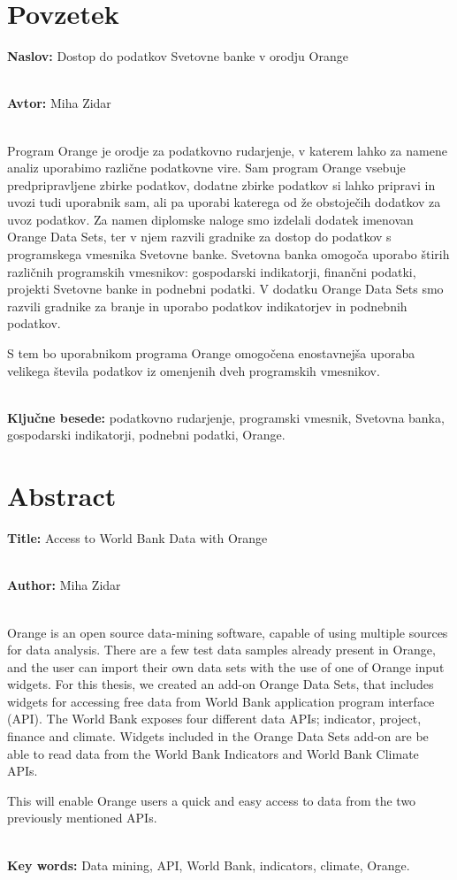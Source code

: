 \chapter*{Povzetek}


\textbf{Naslov:} Dostop do podatkov Svetovne banke v orodju Orange

\ \\
\textbf{Avtor:} Miha Zidar

\ \\
Program Orange je orodje za podatkovno rudarjenje, v katerem
lahko za namene analiz uporabimo različne podatkovne vire. Sam program Orange
vsebuje predpripravljene zbirke podatkov, dodatne zbirke podatkov si lahko 
pripravi in uvozi tudi uporabnik sam, ali pa uporabi katerega od že obstoječih
dodatkov za uvoz podatkov. Za namen diplomske naloge smo izdelali dodatek imenovan
Orange Data Sets, ter v njem razvili gradnike za dostop do podatkov s programskega 
vmesnika Svetovne banke. Svetovna banka omogoča uporabo štirih 
različnih programskih vmesnikov: gospodarski indikatorji, finančni podatki,
projekti Svetovne banke in podnebni podatki. V dodatku Orange Data Sets smo
razvili gradnike za branje in uporabo podatkov indikatorjev 
in podnebnih podatkov.

S tem bo uporabnikom programa Orange omogočena enostavnejša uporaba velikega števila
podatkov iz omenjenih dveh programskih vmesnikov.

\ \\
\textbf{Ključne besede:} podatkovno rudarjenje, programski vmesnik, 
Svetovna banka, gospodarski indikatorji, podnebni podatki, Orange. 




\clearemptydoublepage

\chapter*{Abstract}


\textbf{Title:} Access to World Bank Data with Orange

\ \\
\textbf{Author:} Miha Zidar

\ \\
Orange is an open source data-mining software, capable of using multiple sources for data analysis. There are a few test data samples already present in Orange, and the user can import their own data sets with the use of one of Orange input widgets. For this thesis, we created an add-on Orange Data Sets, that includes widgets for accessing free data from World Bank application program interface (API). The World Bank exposes four different data APIs; indicator, project, finance and climate. Widgets included in the Orange Data Sets add-on are be able to read data from the World Bank Indicators and World Bank Climate APIs.

This will enable Orange users a quick and easy access to data from the two previously mentioned APIs.

\ \\
\textbf{Key words:} Data mining, API, World Bank, indicators, climate, Orange.


